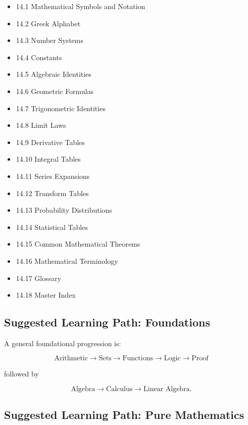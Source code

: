 \begin{itemize}
    \item 14.1 Mathematical Symbols and Notation
    \item 14.2 Greek Alphabet
    \item 14.3 Number Systems
    \item 14.4 Constants
    \item 14.5 Algebraic Identities
    \item 14.6 Geometric Formulas
    \item 14.7 Trigonometric Identities
    \item 14.8 Limit Laws
    \item 14.9 Derivative Tables
    \item 14.10 Integral Tables
    \item 14.11 Series Expansions
    \item 14.12 Transform Tables
    \item 14.13 Probability Distributions
    \item 14.14 Statistical Tables
    \item 14.15 Common Mathematical Theorems
    \item 14.16 Mathematical Terminology
    \item 14.17 Glossary
    \item 14.18 Master Index
\end{itemize}

\subsection{Suggested Learning Path: Foundations}
\label{subsec:index-learning-path-foundations}

A general foundational progression is:

\[
\boxed{
\text{Arithmetic}
\rightarrow
\text{Sets}
\rightarrow
\text{Functions}
\rightarrow
\text{Logic}
\rightarrow
\text{Proof}
}
\]

followed by

\[
\boxed{
\text{Algebra}
\rightarrow
\text{Calculus}
\rightarrow
\text{Linear Algebra}.
}
\]

\subsection{Suggested Learning Path: Pure Mathematics}
\label{subsec:index-learning-path-pure}

